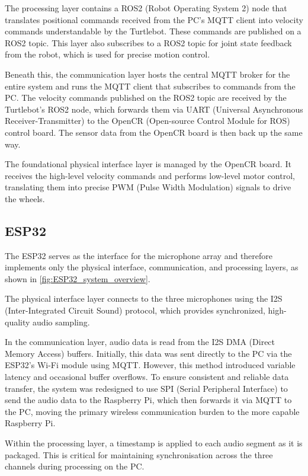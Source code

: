 The processing layer contains a ROS2 (Robot Operating System 2) node that translates positional commands received from the PC's MQTT client into velocity commands understandable by the Turtlebot. These commands are published on a ROS2 topic. This layer also subscribes to a ROS2 topic for joint state feedback from the robot, which is used for precise motion control.

Beneath this, the communication layer hosts the central MQTT broker for the entire system and runs the MQTT client that subscribes to commands from the PC. The velocity commands published on the ROS2 topic are received by the Turtlebot's ROS2 node, which forwards them via UART (Universal Asynchronous Receiver-Transmitter) to the OpenCR (Open-source Control Module for ROS) control board. The sensor data from the OpenCR board is then back up the same way.

The foundational physical interface layer is managed by the OpenCR board. It receives the high-level velocity commands and performs low-level motor control, translating them into precise PWM (Pulse Width Modulation) signals to drive the wheels.

\subsection{ESP32}
The ESP32 serves as the interface for the microphone array and therefore implements only the physical interface, communication, and processing layers, as shown in \cref{fig:ESP32_system_overview}.

The physical interface layer connects to the three microphones using the I2S (Inter-Integrated Circuit Sound) protocol, which provides synchronized, high-quality audio sampling.

In the communication layer, audio data is read from the I2S DMA (Direct Memory Access) buffers. Initially, this data was sent directly to the PC via the ESP32's Wi-Fi module using MQTT. However, this method introduced variable latency and occasional buffer overflows. To ensure consistent and reliable data transfer, the system was redesigned to use SPI (Serial Peripheral Interface) to send the audio data to the Raspberry Pi, which then forwards it via MQTT to the PC, moving the primary wireless communication burden to the more capable Raspberry Pi.

Within the processing layer, a timestamp is applied to each audio segment as it is packaged. This is critical for maintaining synchronisation across the three channels during processing on the PC.

